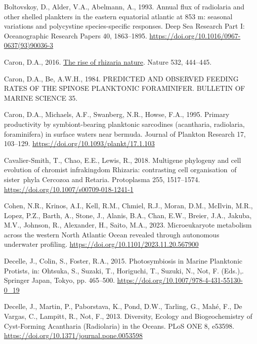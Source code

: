 \documentclass[
]{article}
\newlength{\cslhangindent}
\newlength{\cslentryspacingunit} %
\newenvironment{CSLReferences}[2] %
 {%
  \setlength{\parindent}{0pt}
  \ifodd #1
  \let\oldpar\par
  \def\par{\hangindent=\cslhangindent\oldpar}
  \fi
  \setlength{\parskip}{#2\cslentryspacingunit}
 }%
 {}
\begin{document}
\begin{CSLReferences}{1}{0}
\leavevmode{}%
Boltovskoy, D., Alder, V.A., Abelmann, A., 1993. Annual flux of
radiolaria and other shelled plankters in the eastern equatorial
atlantic at 853 m: seasonal variations and polycystine species-specific
responses. Deep Sea Research Part I: Oceanographic Research Papers 40,
1863--1895. \url{https://doi.org/10.1016/0967-0637(93)90036-3}

\leavevmode{}%
Caron, D.A., 2016.
\href{https://www.nature.com/articles/nature17892}{The rise of rhizaria
\textbar{} nature}. Nature 532, 444--445.

\leavevmode{}%
Caron, D.A., Be, A.W.H., 1984. PREDICTED AND OBSERVED FEEDING RATES OF
THE SPINOSE PLANKTONIC FORAMINIFER. BULLETIN OF MARINE SCIENCE 35.

\leavevmode{}%
Caron, D.A., Michaels, A.F., Swanberg, N.R., Howse, F.A., 1995. Primary
productivity by symbiont-bearing planktonic sarcodines (acantharia,
radiolaria, foraminifera) in surface waters near bermuda. Journal of
Plankton Research 17, 103--129.
\url{https://doi.org/10.1093/plankt/17.1.103}

\leavevmode{}%
Cavalier-Smith, T., Chao, E.E., Lewis, R., 2018. Multigene phylogeny and
cell evolution of chromist infrakingdom Rhizaria: contrasting cell
organisation~of sister~phyla Cercozoa and Retaria. Protoplasma 255,
1517--1574. \url{https://doi.org/10.1007/s00709-018-1241-1}

\leavevmode{}%
Cohen, N.R., Krinos, A.I., Kell, R.M., Chmiel, R.J., Moran, D.M.,
McIlvin, M.R., Lopez, P.Z., Barth, A., Stone, J., Alanis, B.A., Chan,
E.W., Breier, J.A., Jakuba, M.V., Johnson, R., Alexander, H., Saito,
M.A., 2023. Microeukaryote metabolism across the western North Atlantic
Ocean revealed through autonomous underwater profiling.
\url{https://doi.org/10.1101/2023.11.20.567900}

\leavevmode{}%
Decelle, J., Colin, S., Foster, R.A., 2015. Photosymbiosis in Marine
Planktonic Protists, in: Ohtsuka, S., Suzaki, T., Horiguchi, T., Suzuki,
N., Not, F. (Eds.),. Springer Japan, Tokyo, pp. 465--500.
\url{https://doi.org/10.1007/978-4-431-55130-0_19}

\leavevmode{}%
Decelle, J., Martin, P., Paborstava, K., Pond, D.W., Tarling, G., Mahé,
F., De Vargas, C., Lampitt, R., Not, F., 2013. Diversity, Ecology and
Biogeochemistry of Cyst-Forming Acantharia (Radiolaria) in the Oceans.
PLoS ONE 8, e53598. \url{https://doi.org/10.1371/journal.pone.0053598}


\end{CSLReferences}
\end{document}
